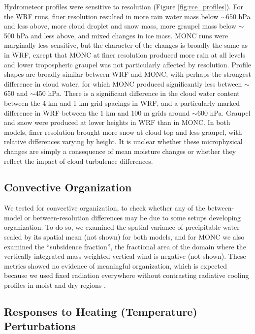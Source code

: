 \documentclass[draft]{agujournal2019}
\begin{document}
Hydrometeor profiles were sensitive to resolution (Figure
\ref{fig:rce_profiles}). For the WRF runs, finer resolution resulted in more
rain water mass below $\sim$650 hPa and less above, more cloud droplet and snow
mass, more graupel mass below $\sim$500 hPa and less above, and mixed changes in
ice mass. MONC runs were marginally less sensitive, but the character
of the changes is broadly the same as in WRF, except that MONC at finer
resolution produced more rain at all levels and lower tropospheric graupel was
not particularly affected by resolution. Profile shapes are broadly similar
between WRF and MONC, with perhaps the strongest difference in cloud water, for
which MONC produced significantly less between $\sim$650 and $\sim$450 hPa.
There is a significant difference in the cloud water content between the 4 km
and 1 km grid spacings in WRF, and a particularly marked difference in WRF
between the 1 km and 100 m grids around $\sim$600 hPa. Graupel and snow were
produced at lower heights in WRF than in MONC. In both models, finer resolution
brought more snow at cloud top and less graupel, with relative differences
varying by height. It is unclear whether these microphysical changes are simply
a consequence of mean moisture changes or whether they reflect the impact of
cloud turbulence differences.

\subsection{Convective Organization}

We tested for convective organization, to check whether any of the between-model
or between-resolution differences may be due to some setups developing
organization. To do so, we examined the spatial variance of precipitable water
scaled by its spatial mean (not shown) for both models, and for MONC we also examined
the ``subsidence fraction'', the fractional area of the domain where the
vertically integrated mass-weighted vertical wind is negative (not shown). These
metrics showed no evidence of meaningful organization, which is expected because
we used fixed radiation everywhere without contrasting radiative cooling
profiles in moist and dry regions \cite{Muller_GRL_2015}.

\subsection{Responses to Heating (Temperature) Perturbations}
\end{document}
